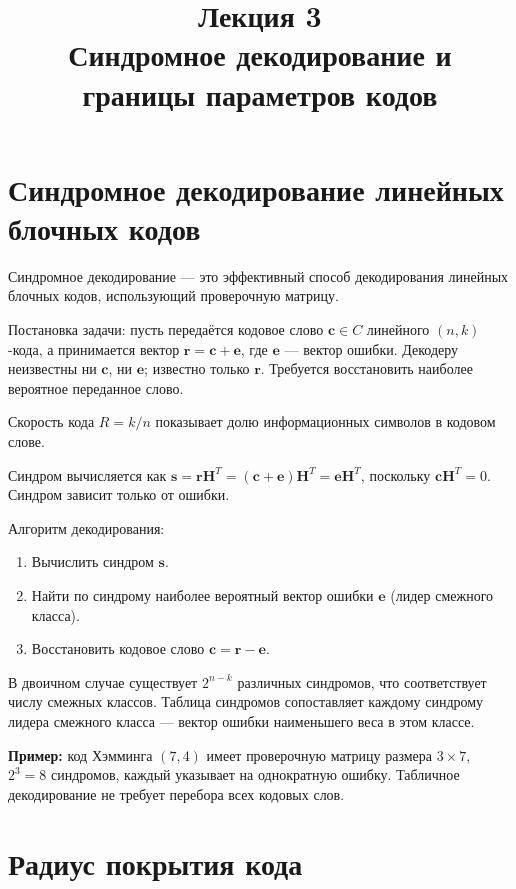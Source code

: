 \documentclass{article}
\title{Лекция 3 \\ Синдромное декодирование и границы параметров кодов}
\author{}
\date{}
\begin{document}
\maketitle

\section{Синдромное декодирование линейных блочных кодов}

Синдромное декодирование — это эффективный способ декодирования линейных блочных кодов, использующий проверочную матрицу. 

Постановка задачи: пусть передаётся кодовое слово \( \mathbf{c} \in C \) линейного \((n,k)\)-кода, а принимается вектор \( \mathbf{r} = \mathbf{c} + \mathbf{e} \), где \( \mathbf{e} \) — вектор ошибки. Декодеру неизвестны ни \( \mathbf{c} \), ни \( \mathbf{e} \); известно только \( \mathbf{r} \). Требуется восстановить наиболее вероятное переданное слово.

Скорость кода \( R = k/n \) показывает долю информационных символов в кодовом слове.

Синдром вычисляется как \( \mathbf{s} = \mathbf{r} \mathbf{H}^T = (\mathbf{c} + \mathbf{e}) \mathbf{H}^T = \mathbf{e} \mathbf{H}^T \), поскольку \( \mathbf{c} \mathbf{H}^T = 0 \). Синдром зависит только от ошибки.

Алгоритм декодирования:
\begin{enumerate}
    \item Вычислить синдром \( \mathbf{s} \).
    \item Найти по синдрому наиболее вероятный вектор ошибки \( \mathbf{e} \) (лидер смежного класса).
    \item Восстановить кодовое слово \( \mathbf{c} = \mathbf{r} - \mathbf{e} \).
\end{enumerate}

В двоичном случае существует \( 2^{n-k} \) различных синдромов, что соответствует числу смежных классов. Таблица синдромов сопоставляет каждому синдрому лидера смежного класса — вектор ошибки наименьшего веса в этом классе.

\textbf{Пример:} код Хэмминга \((7,4)\) имеет проверочную матрицу размера \(3 \times 7\), \( 2^3 = 8 \) синдромов, каждый указывает на однократную ошибку. Табличное декодирование не требует перебора всех кодовых слов.

\section{Радиус покрытия кода}
\end{document}
